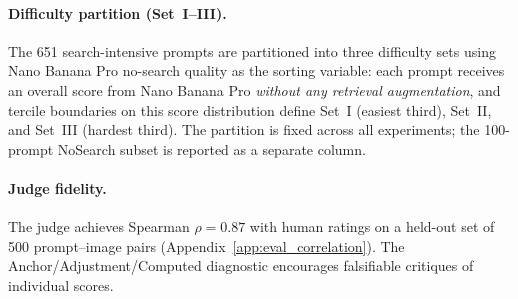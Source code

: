 \paragraph{Difficulty partition (Set~I--III).}
The 651 search-intensive prompts are partitioned into three difficulty sets using Nano Banana Pro no-search quality as the sorting variable: each prompt receives an overall score from Nano Banana Pro \emph{without any retrieval augmentation}, and tercile boundaries on this score distribution define Set~I (easiest third), Set~II, and Set~III (hardest third).
The partition is fixed across all experiments; the 100-prompt NoSearch subset is reported as a separate column.

\paragraph{Judge fidelity.}
The judge achieves Spearman $\rho = 0.87$ with human ratings on a
held-out set of 500 prompt--image pairs
(Appendix~\ref{app:eval_correlation}). The Anchor/Adjustment/Computed
diagnostic encourages falsifiable critiques of individual scores.
